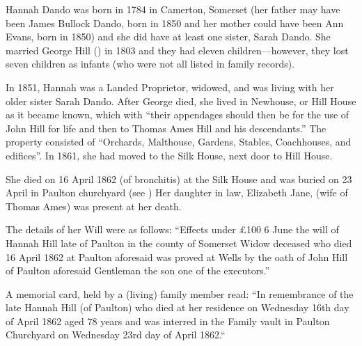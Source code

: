 
Hannah Dando was born in 1784 in Camerton, Somerset (her father may have been James Bullock Dando, born in 1850 and her mother could have been Ann Evans, born in 1850) and she did have at least one sister, Sarah Dando.  She married George Hill () in 1803 and they had eleven children---however, they lost seven children as infants (who were not all listed in family records).

In 1851, Hannah was a Landed Proprietor, widowed, and was living with her older sister Sarah Dando.\cite{HDandoHome} After George died, she lived in Newhouse, or Hill House as it became known, which with ``their appendages should then be for the use of John Hill for life and then to Thomas Ames Hill and his descendants.'' The property consisted of ``Orchards, Malthouse, Gardens, Stables, Coachhouses, and edifices''. In 1861, she had moved to the Silk House, next door to Hill House.\cite{HDando1861}

She died on 16 April 1862 (of bronchitis) at the Silk House and was buried on 23 April in Paulton churchyard (see ) Her daughter in law, Elizabeth Jane, (wife of Thomas Ames) was present at her death.

The details of her Will were as follows: 
``Effects under \pounds 100 6 June the will of Hannah Hill late of Paulton in the county of Somerset Widow deceased who died 16 April 1862 at Paulton aforesaid was proved at Wells by the oath of John Hill of Paulton aforesaid Gentleman the son one of the executors.''

A memorial card, held by a (living) family member read:
``In remembrance of the late Hannah Hill (of Paulton) who died at her residence on Wednesday 16th day of April 1862 aged 78 years and was interred in the Family vault in Paulton Churchyard on Wednesday 23rd day of April 1862.``
